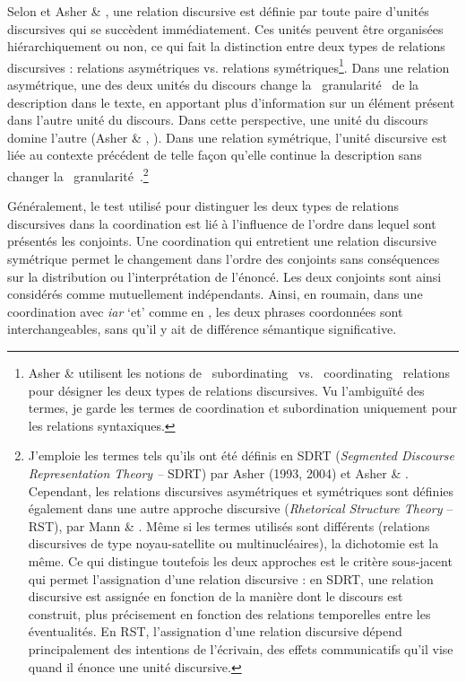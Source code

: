 Selon \citet{Asher1993} et Asher \& \citet{Lascarides2003}, une relation discursive est définie par toute paire d'unités discursives qui se succèdent immédiatement. Ces unités peuvent être  organisées hiérarchiquement ou non, ce qui fait la distinction entre deux types de relations discursives : relations asymétriques vs. relations symétriques\footnote{Asher \& \citet{Lascarides2003} utilisent les notions de {\guillemotleft}~subordinating~{\guillemotright} vs. {\guillemotleft}~coordinating~{\guillemotright} relations pour désigner les deux types de relations discursives. Vu l'ambiguïté des termes, je garde les termes de coordination et subordination uniquement pour les relations syntaxiques.}. Dans une relation asymétrique, une des deux unités du discours change la {\guillemotleft}~granularité~{\guillemotright} de la description dans le texte, en apportant plus d'information sur un élément présent dans l'autre unité du discours. Dans cette perspective, une unité du discours domine l'autre (Asher \& \citet{Lascarides2003}, \citet{Asher2004}). Dans une relation symétrique, l'unité discursive est liée au contexte précédent de telle façon qu'elle continue la description sans changer la {\guillemotleft}~granularité~{\guillemotright}.\footnote{J'emploie les termes tels qu'ils ont été définis en SDRT (\textit{Segmented Discourse Representation Theory --} SDRT) par Asher (1993, 2004) et Asher \& \citet{Lascarides2003}. Cependant, les relations discursives asymétriques et symétriques sont définies également dans une autre approche discursive (\textit{Rhetorical Structure Theory} -- RST), par Mann \& \citet{Thompson1988}. Même si les termes utilisés sont différents (relations discursives de type noyau-satellite ou multinucléaires), la dichotomie est la même. Ce qui distingue toutefois les deux approches est le critère sous-jacent qui permet l'assignation d'une relation discursive : en SDRT, une relation discursive est assignée en fonction de la manière dont le discours est construit, plus précisement en fonction des relations temporelles entre les éventualités. En RST, l'assignation d'une relation discursive dépend principalement des intentions de l'écrivain, des effets communicatifs qu'il vise quand il énonce une unité discursive. }   

Généralement, le test utilisé pour distinguer les deux types de relations discursives dans la coordination est lié à l'influence de l'ordre dans lequel sont présentés les conjoints. Une coordination qui entretient une relation discursive symétrique permet le changement dans l'ordre des conjoints sans conséquences sur la distribution ou l'interprétation de l'énoncé. Les deux conjoints sont ainsi considérés comme mutuellement indépendants. Ainsi, en roumain, dans une coordination avec \textit{iar} `et' comme en , les deux phrases coordonnées sont interchangeables, sans qu'il y ait de différence sémantique significative. 


